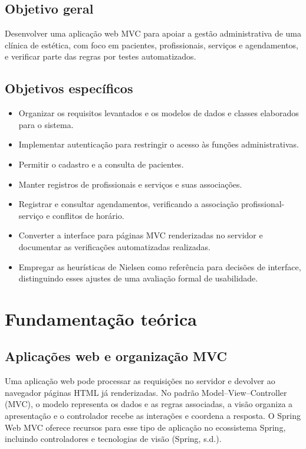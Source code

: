 \documentclass[12pt,a4paper]{article}
\begin{document}
\subsection{Objetivo geral}

Desenvolver uma aplicação web MVC para apoiar a gestão administrativa de uma clínica de estética, com foco em pacientes, profissionais, serviços e agendamentos, e verificar parte das regras por testes automatizados.

\subsection{Objetivos específicos}

\begin{itemize}
\item Organizar os requisitos levantados e os modelos de dados e classes elaborados para o sistema.
\item Implementar autenticação para restringir o acesso às funções administrativas.
\item Permitir o cadastro e a consulta de pacientes.
\item Manter registros de profissionais e serviços e suas associações.
\item Registrar e consultar agendamentos, verificando a associação profissional-serviço e conflitos de horário.
\item Converter a interface para páginas MVC renderizadas no servidor e documentar as verificações automatizadas realizadas.
\item Empregar as heurísticas de Nielsen como referência para decisões de interface, distinguindo esses ajustes de uma avaliação formal de usabilidade.
\end{itemize}

\section{Fundamentação teórica}

\subsection{Aplicações web e organização MVC}

Uma aplicação web pode processar as requisições no servidor e devolver ao navegador páginas HTML já renderizadas. No padrão Model--View--Controller (MVC), o modelo representa os dados e as regras associadas, a visão organiza a apresentação e o controlador recebe as interações e coordena a resposta. O Spring Web MVC oferece recursos para esse tipo de aplicação no ecossistema Spring, incluindo controladores e tecnologias de visão (Spring, s.d.).
\end{document}

